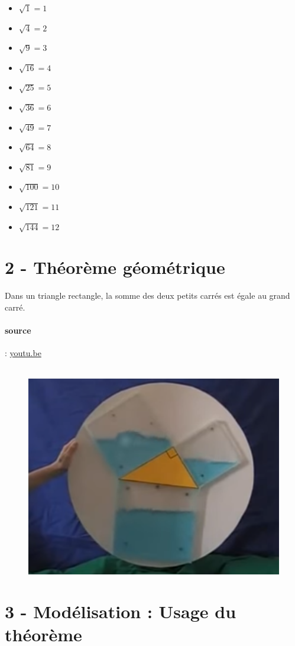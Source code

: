 \documentclass[12pt]{article}
\begin{document}
\begin{multicols}{2}
	\begin{itemize}
		\item $\sqrt{1} = 1$
		\item $\sqrt{4} = 2$
		\item $\sqrt{9} = 3$
		\item $\sqrt{16} = 4$
		\item $\sqrt{25} = 5$
		\item $\sqrt{36} = 6$
		\item $\sqrt{49} = 7$
		\item $\sqrt{64} = 8$
		\item $\sqrt{81} = 9$
		\item $\sqrt{100} = 10$
		\item $\sqrt{121} = 11$
		\item $\sqrt{144} = 12$
	\end{itemize}

\end{multicols}

\newpage

\section*{2 - Théorème géométrique}

Dans un triangle rectangle, la somme des deux petits carrés est égale au grand carré.

\paragraph{source} : \url{youtu.be}

  \begin{figure}[H]
        \centering
        \includegraphics[width=0.6\linewidth]{4x4-pythagore/sources/pyth.png}
  \end{figure}

\section*{3 - Modélisation : Usage du théorème}
\end{document}
